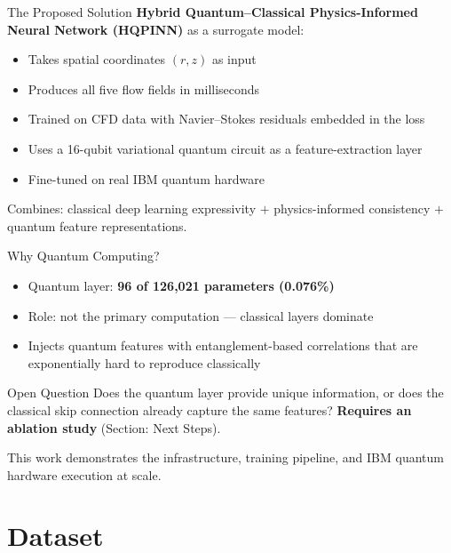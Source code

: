 \documentclass[aspectratio=169]{beamer}
\begin{document}
\begin{frame}{The Proposed Solution}
\textbf{Hybrid Quantum--Classical Physics-Informed Neural Network (HQPINN)} as a surrogate model:

\begin{itemize}
  \item Takes spatial coordinates $(r, z)$ as input
  \item Produces all five flow fields in milliseconds
  \item Trained on CFD data with Navier--Stokes residuals embedded in the loss
  \item Uses a 16-qubit variational quantum circuit as a feature-extraction layer
  \item Fine-tuned on real IBM quantum hardware
\end{itemize}

\vspace{0.3cm}
Combines: classical deep learning expressivity $+$ physics-informed consistency $+$ quantum feature representations.
\end{frame}

\begin{frame}{Why Quantum Computing?}
\begin{itemize}
  \item Quantum layer: \textbf{96 of 126,021 parameters (0.076\%)}
  \item Role: not the primary computation --- classical layers dominate
  \item Injects quantum features with entanglement-based correlations that are exponentially hard to reproduce classically
\end{itemize}

\vspace{0.3cm}
\begin{alertblock}{Open Question}
Does the quantum layer provide unique information, or does the classical skip connection already capture the same features? \textbf{Requires an ablation study} (Section: Next Steps).
\end{alertblock}

This work demonstrates the infrastructure, training pipeline, and IBM quantum hardware execution at scale.
\end{frame}

\section{Dataset}
\end{document}

